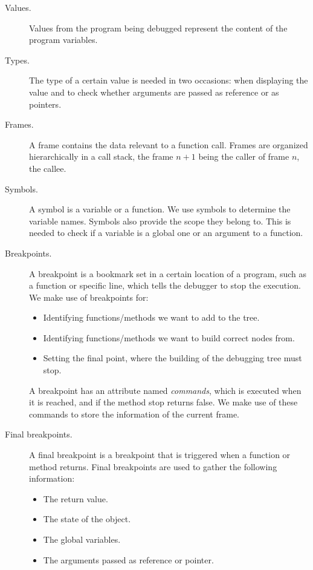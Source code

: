 \begin{description}

\item[Values.]
Values from the program being debugged represent the content of the program variables.

\item[Types.]
The type of a certain value is needed in two occasions: when displaying the value and to check whether arguments are passed as reference or as pointers.
\item[Frames.] 
A frame contains the data relevant to a function call.
Frames are organized hierarchically in a call stack, the frame \(n+1\) being the caller of frame \(n\), the callee.
\item[Symbols.] A symbol is a variable or a function. We use symbols to determine the variable names. Symbols also provide the scope they belong to. This is needed to check if a variable is a global one or an argument to a function.

\item[Breakpoints.]
A breakpoint is a bookmark set in a certain location of a program, such as a function or specific line, which tells the debugger to stop the execution.
We make use of breakpoints for:
\begin{itemize}
    \item Identifying functions/methods we want to add to the tree.
    \item Identifying functions/methods we want to build correct nodes from.
    \item Setting the final point, where the building of the debugging tree must stop.
\end{itemize}
A breakpoint has an attribute named \emph{commands}, which is executed when it is reached, and if the method stop returns false.
%
We make use of these commands to store the information of the current frame.

\item[Final breakpoints.]
A final breakpoint is a breakpoint that is triggered when a function or method returns. Final breakpoints are used to gather the following information:
\begin{itemize}
    \item The return value.
    \item The state of the object.
    \item The global variables.
    \item The arguments passed as reference or pointer.
\end{itemize}
\end{description}
